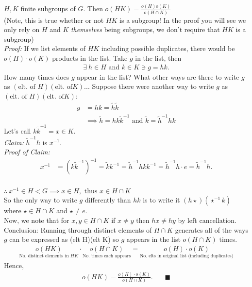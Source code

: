 \begin{theorem}
$H, K$ finite subgroups of $G$. Then $o(HK)= \frac{o(H)o(K)}{o(H\cap K)}$ \steezybreak\\
(Note, this is true whether or not $HK$ is a subgroup! In the proof you will see we only rely on $H$ and $K$ \textit{themselves} being subgroups, we don't require that $HK$ is a subgroup) \steezybreak\\
\textit{Proof:} If we list elements of $HK$ including possible duplicates, there would be $o(H)\cdot o(K)$ products in the list. Take $g$ in the list, then 
\begin{align}
    \exists \ h\in H \text{ and } k\in K \ni g=hk.\nonumber
\end{align}
How many times does $g$ appear in the list? What other ways are there to write $g$ as $(\text{elt. of }H)(\text{elt. of} K)$... Suppose there were another way to write $g$ as $(\text{elt. of }H)(\text{elt. of} K)$:
\begin{align}
    g&=hk=\tilde{h}\tilde{k} \nonumber \\
    &\implies \tilde{h}=hk\tilde{k}^{-1}  \text{ and } \tilde{k}=\tilde{h}^{-1}hk \nonumber
\end{align}
Let's call $k\tilde{k}^{-1} =x \in K$. \steezybreak\\
\textit{Claim:} $\tilde{h}^{-1}h$ is $x^{-1}$.\\
\textit{Proof of Claim:}
\begin{align}
    x^{-1}&=(k\tilde{k}^{-1})^{-1}= \tilde{k}k^{-1}=\tilde{h}^{-1}hkk^{-1}=\tilde{h}^{-1}h\cdot e=\tilde{h}^{-1}h. \nonumber
\end{align}\steezybreak\\
$\therefore \ x^{-1} \in H < G \implies x \in H, \text{ thus } x\in H\cap K $ \\
So the only way to write $g$ differently than $hk$ is to write it $(h \star)(\star^{-1}k)$ where $\star \in H \cap K$ and $\star \neq e$. \\
Now, we note that for $x,y \in H\cap K$ if $x\neq y$ then $hx\neq hy$ by left cancellation. \\
Conclusion: Running through distinct elements of $H\cap K$ generates all of the ways $g$ can be expressed as (elt H)(elt K) so $g$ appears in the list $o(H\cap K)$ times. 
\begin{align}
    \underset{\text{No. distinct elements in $HK$}}{o(HK)}\cdot \underset{\text{No. times each appears}}{o(H\cap K)}= \underset{\text{No. elts in original list (including duplicates)}}{o(H)\cdot o(K)} \nonumber
\end{align}
Hence,
\begin{align}
    o(HK)=\frac{o(H)\cdot o(K)}{o(H\cap K)}. \ \ \ \ \ \ \ \ \blacksquare \nonumber
\end{align}
\end{theorem}
